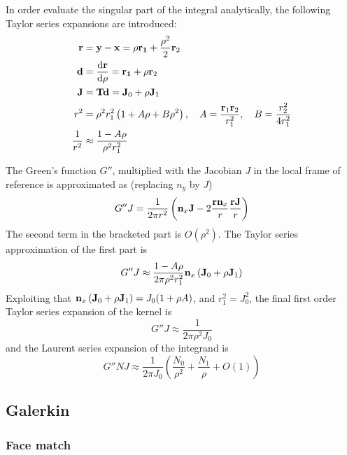 \documentclass[a4paper,11pt]{article}
\newcommand{\td}{\mathrm{d}}
\begin{document}
In order evaluate the singular part of the integral analytically, the following Taylor series expansions are introduced:
\begin{align}
	{\bf r} &= {\bf y} - {\bf x} = \rho {\bf r_1} + \frac{\rho^2}{2} {\bf r}_2 \\
	{\bf d} &= \frac{\td {\bf r}}{\td \rho} = {\bf r_1} + \rho {\bf r}_2 \\
	{\bf J} &= {\bf T} {\bf d} = {\bf J}_0 + \rho {\bf J}_1 \\
	r^2 &= \rho^2 r_1^2 \left( 1 + A \rho + B \rho^2 \right)
	,\quad A = \frac{{\bf r}_1 {\bf r}_2}{r_1^2}
	,\quad B = \frac{r_2^2}{4 r_1^2} \\
	\frac{1}{r^2} &\approx \frac{1 - A \rho}{\rho^2 r_1^2}
\end{align}

The Green's function $G''$, multiplied with the Jacobian $J$ in the local frame of reference is approximated as (replacing $n_y$ by $J$)
%
\begin{equation}
	G'' J = \frac{1}{2\pi r^2} \left( {\bf n}_x {\bf J} - 2 \frac{{\bf r} {\bf n}_x}{r} \frac{{\bf r} {\bf J}}{r}\right)
\end{equation}
%
The second term in the bracketed part is $O(\rho^2)$. The Taylor series approximation of the first part is
%
\begin{equation}
	G'' J \approx \frac{1 - A \rho}{2\pi \rho^2 r_1^2} {\bf n}_x \left({\bf J}_0 + \rho {\bf J}_1\right) 
\end{equation}
%
Exploiting that ${\bf n}_x \left({\bf J}_0 + \rho {\bf J}_1\right) = J_0 (1 + \rho A)$, and $r_1^2 = J_0^2$, the final first order Taylor series expansion of the kernel is
%
\begin{equation}
	G'' J \approx \frac{1}{2\pi \rho^2 J_0}
\end{equation}
%
and the Laurent series expansion of the integrand is
%
\begin{equation}
	G'' N J \approx \frac{1}{2\pi J_0} \left( \frac{N_0}{\rho^2} +  \frac{N_1}{\rho} + O(1)\right)
\end{equation}


\subsection{Galerkin}

\subsubsection{Face match}
\end{document}
